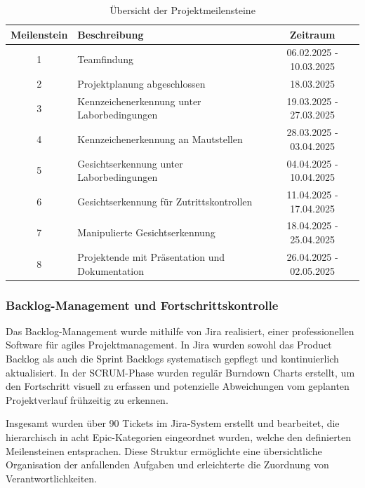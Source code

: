 \begin{table}[h]
    \centering
    \begin{tabular}{|c|l|c|}
        \hline
        \textbf{Meilenstein} & \textbf{Beschreibung} & \textbf{Zeitraum} \\
        \hline
        1 & Teamfindung & 06.02.2025 - 10.03.2025 \\
        \hline
        2 & Projektplanung abgeschlossen & 18.03.2025 \\
        \hline
        3 & Kennzeichenerkennung unter Laborbedingungen & 19.03.2025 - 27.03.2025 \\
        \hline
        4 & Kennzeichenerkennung an Mautstellen & 28.03.2025 - 03.04.2025 \\
        \hline
        5 & Gesichtserkennung unter Laborbedingungen & 04.04.2025 - 10.04.2025 \\
        \hline
        6 & Gesichtserkennung für Zutrittskontrollen & 11.04.2025 - 17.04.2025 \\
        \hline
        7 & Manipulierte Gesichtserkennung & 18.04.2025 - 25.04.2025 \\
        \hline
        8 & Projektende mit Präsentation und Dokumentation & 26.04.2025 - 02.05.2025 \\
        \hline
    \end{tabular}
    \caption{Übersicht der Projektmeilensteine}
    \label{tab:milestones}
\end{table}

\subsubsection{Backlog-Management und Fortschrittskontrolle}

Das Backlog-Management wurde mithilfe von Jira realisiert, einer professionellen Software für agiles Projektmanagement. In Jira wurden sowohl das Product Backlog als auch die Sprint Backlogs systematisch gepflegt und kontinuierlich aktualisiert. In der SCRUM-Phase wurden regulär Burndown Charts erstellt, um den Fortschritt visuell zu erfassen und potenzielle Abweichungen vom geplanten Projektverlauf frühzeitig zu erkennen.

Insgesamt wurden über 90 Tickets im Jira-System erstellt und bearbeitet, die hierarchisch in acht Epic-Kategorien eingeordnet wurden, welche den definierten Meilensteinen entsprachen. Diese Struktur ermöglichte eine übersichtliche Organisation der anfallenden Aufgaben und erleichterte die Zuordnung von Verantwortlichkeiten.


